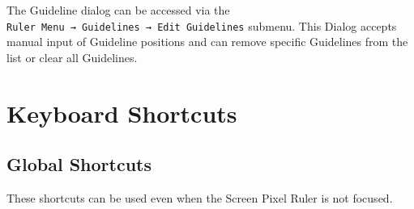 \documentclass[
]{book}
\begin{document}
The Guideline dialog can be accessed via the \texttt{Ruler\ Menu\ →\ Guidelines\ →\ Edit\ Guidelines} submenu.
This Dialog accepts manual input of Guideline positions and can remove specific Guidelines from the list or clear all Guidelines.

\hypertarget{keyboard}{%
\chapter{Keyboard Shortcuts}\label{keyboard}}

\hypertarget{global-shortcuts}{%
\section{Global Shortcuts}\label{global-shortcuts}}

These shortcuts can be used even when the Screen Pixel Ruler is not focused.
\end{document}
